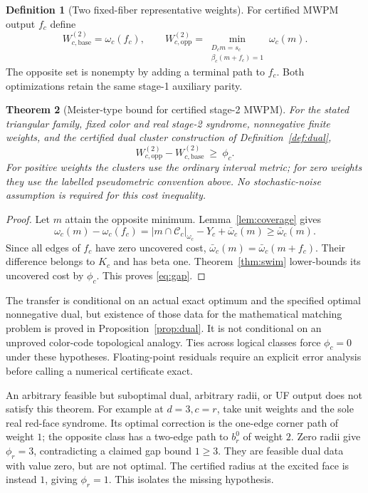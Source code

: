 \documentclass[11pt]{article}
\theoremstyle{definition}
\newtheorem{definition}{Definition}[section]
\theoremstyle{plain}
\newtheorem{theorem}[definition]{Theorem}
\theoremstyle{remark}
\begin{document}
\begin{definition}[Two fixed-fiber representative weights]\label{def:gap}
For certified MWPM output $f_c$ define
\[
 W_{c,\mathrm{base}}^{(2)}=\omega_c(f_c),\qquad
 W_{c,\mathrm{opp}}^{(2)}
 =\min_{\substack{D_cm=s_c\\\beta_c(m+f_c)=1}}\omega_c(m).
\]
The opposite set is nonempty by adding a terminal path to $f_c$.
Both optimizations retain the same stage-1 auxiliary parity.
\end{definition}

\begin{theorem}[Meister-type bound for certified stage-2 MWPM]
\label{thm:gap}
For the stated triangular family, fixed color and real stage-2
syndrome, nonnegative finite weights, and the certified dual
cluster construction of Definition~\ref{def:dual},
\begin{equation}
 W_{c,\mathrm{opp}}^{(2)}-W_{c,\mathrm{base}}^{(2)}
 \ \ge\ \phi_c .
 \label{eq:gap}
\end{equation}
For positive weights the clusters use the ordinary interval metric;
for zero weights they use the labelled pseudometric convention above.
No stochastic-noise assumption is required for this cost inequality.
\end{theorem}
\begin{proof}
Let $m$ attain the opposite minimum. Lemma~\ref{lem:coverage} gives
\[
 \omega_c(m)-\omega_c(f_c)
 =|m\cap\mathcal C_c|_{\omega_c}
    -Y_c+\bar\omega_c(m)\ge\bar\omega_c(m).
\]
Since all edges of $f_c$ have zero uncovered cost,
$\bar\omega_c(m)=\bar\omega_c(m+f_c)$.
Their difference belongs to $K_c$ and has beta one.
Theorem~\ref{thm:swim} lower-bounds its uncovered cost by $\phi_c$.
This proves \eqref{eq:gap}.
\end{proof}

The transfer is conditional on an actual exact optimum and the
specified optimal nonnegative dual, but existence of those data for
the mathematical matching problem is proved in Proposition~\ref{prop:dual}.
It is not conditional on an unproved color-code topological analogy.
Ties across logical classes force $\phi_c=0$ under these hypotheses.
Floating-point residuals require an explicit error analysis before
calling a numerical certificate exact.

An arbitrary feasible but suboptimal dual, arbitrary radii, or UF
output does not satisfy this theorem. For example at $d=3,c=r$,
take unit weights and the sole real red-face syndrome.
Its optimal correction is the one-edge corner path of weight $1$;
the opposite class has a two-edge path to $b_r^0$ of weight $2$.
Zero radii give $\phi_r=3$, contradicting a claimed gap bound
$1\ge3$. They are feasible dual data with value zero, but are not
optimal. The certified radius at the excited face is instead $1$,
giving $\phi_r=1$. This isolates the missing hypothesis.
\end{document}
